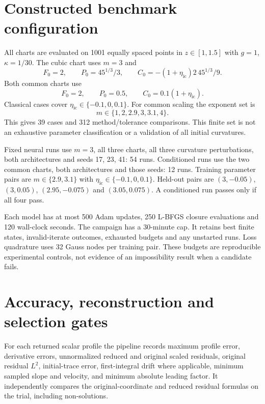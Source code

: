 \documentclass[12pt,a4paper,oneside]{report}
\numberwithin{equation}{chapter}
\begin{document}
\section{Constructed benchmark configuration}
All charts are evaluated on 1001 equally spaced points in $z\in[1,1.5]$ with
$g=1$, $\kappa=1/30$. The cubic chart uses $m=3$ and
\begin{equation}
F_0=2,\qquad P_0=45^{1/3}/3,\qquad
C_0=-(1+\eta_{\mathrm{ic}})2\,45^{1/3}/9.
\end{equation}
Both common charts use
\begin{equation}
F_0=2,\qquad P_0=0.5,\qquad C_0=0.1(1+\eta_{\mathrm{ic}}).
\end{equation}
Classical cases cover $\eta_{\mathrm{ic}}\in\{-0.1,0,0.1\}$.
For common scaling the exponent set is
\begin{equation*}
m\in\{1,2,2.9,3,3.1,4\}.
\end{equation*}
This gives 39 cases and 312
method/tolerance comparisons. This finite set is not an exhaustive parameter
classification or a validation of all initial curvatures.

Fixed neural runs use $m=3$, all three charts, all three curvature
perturbations, both architectures and seeds 17, 23, 41: 54 runs. Conditioned
runs use the two common charts, both architectures and those seeds: 12 runs.
Training parameter pairs are $m\in\{2.9,3.1\}$ with
$\eta_{\mathrm{ic}}\in\{-0.1,0,0.1\}$. Held-out pairs are
$(3,-0.05)$, $(3,0.05)$, $(2.95,-0.075)$ and $(3.05,0.075)$.
A conditioned run passes only if all four pass.

Each model has at most 500 Adam updates, 250 L-BFGS closure evaluations and
120 wall-clock seconds. The campaign has a 30-minute cap. It retains best
finite states, invalid-iterate outcomes, exhausted budgets and any unstarted
runs. Loss quadrature uses 32 Gauss nodes per training pair. These budgets
are reproducible experimental controls, not evidence of an impossibility
result when a candidate fails.

\section{Accuracy, reconstruction and selection gates}
For each returned scalar profile the pipeline records maximum profile error,
derivative errors, unnormalized reduced and original scaled residuals,
original residual $L^2$, initial-trace error, first-integral drift where
applicable, minimum sampled slope and velocity, and minimum absolute leading
factor. It independently compares the original-coordinate and reduced
residual formulas on the trial, including non-solutions.
\end{document}
